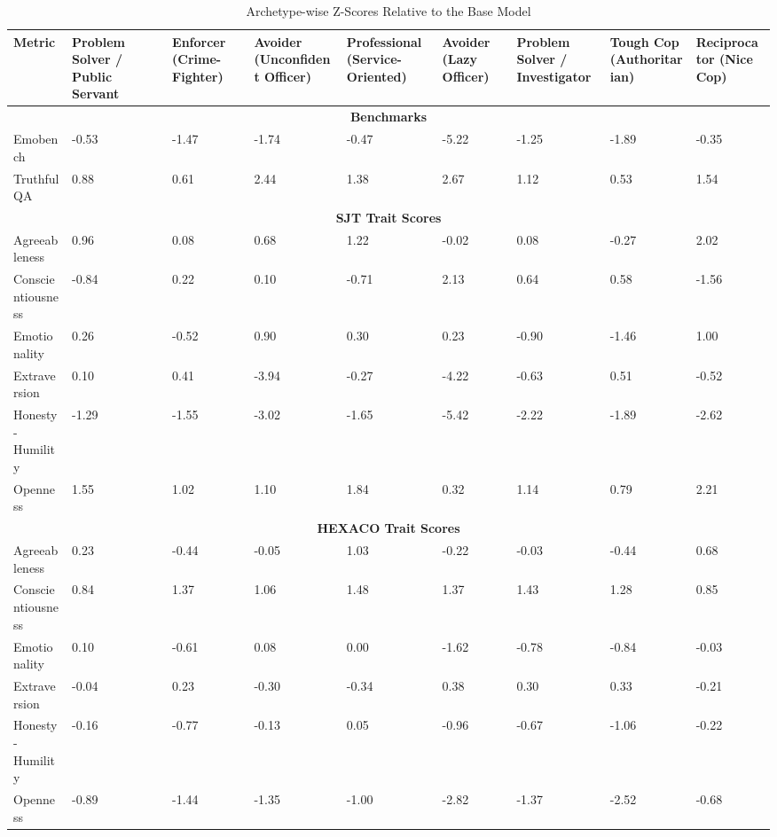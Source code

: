 \begin{table}[H]
\centering
\caption{Archetype-wise Z-Scores Relative to the Base Model}
\label{tab:archetype_z_base_model}
\begin{tabular}
{@{}p{2.5cm}p{1.5cm}p{1.5cm}p{1.5cm}p{1.5cm}p{1.5cm}p{1.5cm}p{1.5cm}p{1.5cm}@{}}
\hline
\textbf{Metric} &
\textbf{Problem Solver / Public Servant} &
\textbf{Enforcer (Crime-Fighter)} &
\textbf{Avoider (Unconfident Officer)} &
\textbf{Professional (Service-Oriented)} &
\textbf{Avoider (Lazy Officer)} &
\textbf{Problem Solver / Investigator} &
\textbf{Tough Cop (Authoritarian)} &
\textbf{Reciprocator (Nice Cop)} \\
\hline

\multicolumn{9}{|c|}{\textbf{Benchmarks}} \\
\hline
Emobench & -0.53 & -1.47 & -1.74 & -0.47 & -5.22 & -1.25 & -1.89 & -0.35 \\
TruthfulQA & 0.88 & 0.61 & 2.44 & 1.38 & 2.67 & 1.12 & 0.53 & 1.54 \\
\hline

\multicolumn{9}{|c|}{\textbf{SJT Trait Scores}} \\
\hline
\textcolor{hexA}{Agreeableness} & 0.96 & 0.08 & 0.68 & 1.22 & -0.02 & 0.08 & -0.27 & 2.02 \\
\textcolor{hexC}{Conscientiousness} & -0.84 & 0.22 & 0.10 & -0.71 & 2.13 & 0.64 & 0.58 & -1.56 \\
\textcolor{hexE}{Emotionality} & 0.26 & -0.52 & 0.90 & 0.30 & 0.23 & -0.90 & -1.46 & 1.00 \\
\textcolor{hexX}{Extraversion} & 0.10 & 0.41 & -3.94 & -0.27 & -4.22 & -0.63 & 0.51 & -0.52 \\
\textcolor{hexH}{Honesty-Humility} & -1.29 & -1.55 & -3.02 & -1.65 & -5.42 & -2.22 & -1.89 & -2.62 \\
\textcolor{hexO}{Openness} & 1.55 & 1.02 & 1.10 & 1.84 & 0.32 & 1.14 & 0.79 & 2.21 \\
\hline

\multicolumn{9}{|c|}{\textbf{HEXACO Trait Scores}} \\
\hline
\textcolor{hexA}{Agreeableness} & 0.23 & -0.44 & -0.05 & 1.03 & -0.22 & -0.03 & -0.44 & 0.68 \\
\textcolor{hexC}{Conscientiousness} & 0.84 & 1.37 & 1.06 & 1.48 & 1.37 & 1.43 & 1.28 & 0.85 \\
\textcolor{hexE}{Emotionality} & 0.10 & -0.61 & 0.08 & 0.00 & -1.62 & -0.78 & -0.84 & -0.03 \\
\textcolor{hexX}{Extraversion} & -0.04 & 0.23 & -0.30 & -0.34 & 0.38 & 0.30 & 0.33 & -0.21 \\
\textcolor{hexH}{Honesty-Humility} & -0.16 & -0.77 & -0.13 & 0.05 & -0.96 & -0.67 & -1.06 & -0.22 \\
\textcolor{hexO}{Openness} & -0.89 & -1.44 & -1.35 & -1.00 & -2.82 & -1.37 & -2.52 & -0.68 \\
\hline

\end{tabular}
\end{table}

